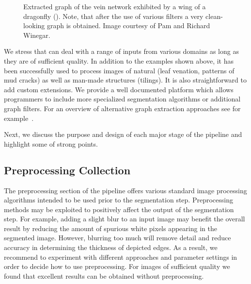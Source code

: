 	\begin{figure}
	\centering
	\caption[\A: Output of \NEFI]{Extracted graph of the vein network exhibited by a wing of a dragonfly (\A). Note, that after the use of various filters a very clean-looking graph is obtained. Image courtesy of Pam and Richard Winegar.}
	\label{fig:dragonlfy}
	\end{figure}


	We stress that \NEFI can deal with a range of inputs from various domains as long as they are of sufficient quality. In addition to the examples shown above, it has been successfully used to process images of natural (\eg leaf venation, patterns of mud cracks) as well as man-made structures (\eg tilings). It is also straightforward to add custom extensions. We provide a well documented platform which allows programmers to include more specialized segmentation algorithms or additional graph filters. For an overview of alternative graph extraction approaches see for example~\cite{dehkordi2011review}.

	Next, we discuss the purpose and design of each major stage of the pipeline and highlight some of \NEFIs strong points.


	\subsection{Preprocessing Collection}

		The preprocessing section of the pipeline offers various standard image processing algorithms intended to be used prior to the segmentation step. Preprocessing methods may be exploited to positively affect the output of the segmentation step. For example, adding a slight blur to an input image may benefit the overall result by reducing the amount of spurious white pixels appearing in the segmented image. However, blurring too much will remove detail and reduce accuracy in determining the thickness of depicted edges. As a result, we recommend to experiment with different approaches and parameter settings in order to decide how to use preprocessing. For images of sufficient quality we found that excellent results can be obtained without preprocessing. 

